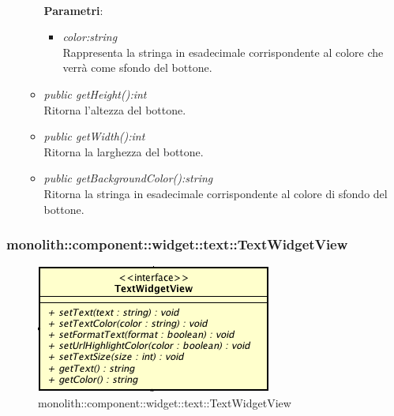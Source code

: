 \begin{itemize}
\begin{itemize}
		\\ \textbf{Parametri}: \begin{itemize}
		\item \textit{color:string}\\
		Rappresenta la stringa in esadecimale corrispondente al colore che verrà come sfondo del bottone.
		\end{itemize}
	\item \textit{public getHeight():int}\\
	Ritorna l'altezza del bottone.
	\item \textit{public getWidth():int}\\
	Ritorna la larghezza del bottone.
	\item \textit{public getBackgroundColor():string}\\
	Ritorna la stringa in esadecimale corrispondente al colore di sfondo del bottone.
	\end{itemize}
\end{itemize}

\subsubsection{monolith::component::widget::text::TextWidgetView}

\label{monolith::component::widget::text::TextWidgetView}
\begin{figure}[H]
	\centering
	\includegraphics[scale=0.5]{Sezioni/SottosezioniST/img/TextWidgetView.png}
	\caption{monolith::component::widget::text::TextWidgetView}
\end{figure}

